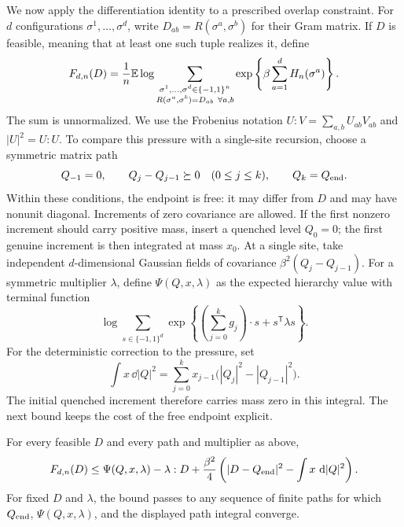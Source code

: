We now apply the differentiation identity to a prescribed overlap
constraint. For $d$ configurations $\sigma^1,\ldots,\sigma^d$, write
$D_{ab}=R(\sigma^a,\sigma^b)$ for their Gram matrix. If $D$ is feasible,
meaning that at least one such tuple realizes it, define
\begin{equation}\label{static-eq:constrained-pressure}
 F_{d,n}(D)=\frac1n\mathbb E\log
 \sum_{\substack{\sigma^1,\ldots,\sigma^d\in\{-1,1\}^n\\
                  R(\sigma^a,\sigma^b)=D_{ab}\ \forall a,b}}
       \exp\left\{\beta\sum_{a=1}^dH_n(\sigma^a)\right\}.
\end{equation}
The sum is unnormalized. We use the Frobenius notation
$U:V=\sum_{a,b}U_{ab}V_{ab}$ and $|U|^2=U:U$.
To compare this pressure with a single-site recursion, choose a symmetric
matrix path
\[
 Q_{-1}=0,\qquad Q_j-Q_{j-1}\succeq0\quad(0\le j\le k),
 \qquad Q_k=Q_{\rm end}.
\]
Within these conditions, the endpoint is free: it may differ from $D$
and may have nonunit diagonal. Increments of zero covariance are
allowed. If the first nonzero increment should carry positive mass,
insert a quenched level $Q_0=0$; the first genuine increment is then
integrated at mass $x_0$. At a single site, take independent
$d$-dimensional Gaussian fields of covariance
$\beta^2(Q_j-Q_{j-1})$. For a symmetric multiplier $\lambda$, define
$\Psi(Q,x,\lambda)$ as the expected hierarchy value with terminal
function
\[
 \log\sum_{s\in\{-1,1\}^d}
     \exp\left\{\left(\sum_{j=0}^kg_j\right)\cdot s
                    +s^{\mathsf T}\lambda s\right\}.
\]
For the deterministic correction to the pressure, set
\begin{equation}\label{static-eq:matrix-path-integral}
 \int x\,\dd|Q|^2
 =\sum_{j=0}^kx_{j-1}\bigl(|Q_j|^2-|Q_{j-1}|^2\bigr).
\end{equation}
The initial quenched increment therefore carries mass zero in this
integral. The next bound keeps the cost of the free endpoint explicit.

\begin{proposition}\label{static-prop:matrix-bound}
For every feasible $D$ and every path and multiplier as above,
\begin{equation}\label{static-eq:matrix-bound}
 F_{d,n}(D)\le
 \Psi(Q,x,\lambda)-\lambda:D
 +\frac{\beta^2}{4}
       \left(|D-Q_{\rm end}|^2-\int x\,\,\mathrm d|Q|^2\right).
\end{equation}
For fixed $D$ and $\lambda$, the bound passes to any sequence of finite
paths for which $Q_{\rm end}$, $\Psi(Q,x,\lambda)$, and the displayed
path integral converge.
\end{proposition}

